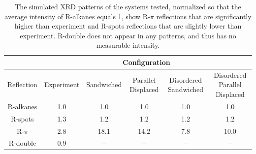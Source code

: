 \documentclass{article}
\begin{document}
  \begin{table}[h]
  \centering
  \begin{tabular}{cccccc}
  \toprule
  		   & \multicolumn{5}{c}{Configuration} \\
  \hline
  Reflection & Experiment & Sandwiched & Parallel Displaced & Disordered Sandwiched & Disordered Parallel Displaced \\
  \midrule
  R-alkanes & 1.0 &  1.0 &  1.0 & 1.0 & 1.0  \\  
  R-spots   & 1.3 &  1.2 &  1.2 & 1.2 & 1.2  \\
  R-$\pi$   & 2.8 & 18.1 & 14.2 & 7.8 & 10.0 \\
  R-double  & 0.9 &  --  & --   &  -- & --   \\ 
  \bottomrule
  \end{tabular}
  \caption{The simulated XRD patterns of the systems tested, normalized so that the average 
  intensity of R-alkanes equals 1, show R-$\pi$ reflections that are significantly higher 
  than experiment and R-spots reflections that are slightly lower than experiment. R-double
  does not appear in any patterns, and thus has no measurable intensity.}
  \label{table:relative_inensities_300K} 
  \end{table}

\end{document}
